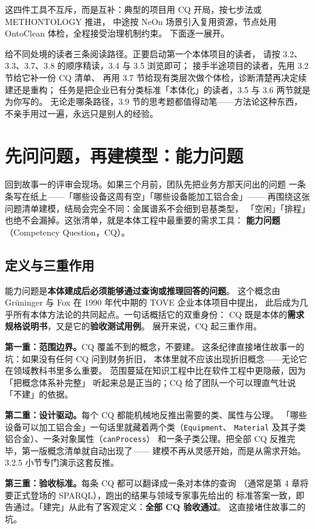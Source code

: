 这四件工具不互斥，而是互补：典型的项目用 CQ 开局，按七步法或 METHONTOLOGY 推进，
中途按 NeOn 场景引入复用资源，节点处用 OntoClean 体检，全程接受治理机制约束。
下面逐一展开。

给不同处境的读者三条阅读路径。正要启动第一个本体项目的读者，
请按 3.2、3.3、3.7、3.8 的顺序精读，3.4 与 3.5 浏览即可；
接手半途项目的读者，先用 3.2 节给它补一份 CQ 清单、
再用 3.7 节给现有类层次做个体检，诊断清楚再决定续建还是重构；
任务是把企业已有分类标准「本体化」的读者，3.5 与 3.6 两节就是为你写的。
无论走哪条路径，3.9 节的思考题都值得动笔——方法论这种东西，
不亲手用过一遍，永远只是别人的经验。

\section{先问问题，再建模型：能力问题}

回到故事一的评审会现场。如果三个月前，团队先把业务方那天问出的问题
一条条写在纸上——「哪些设备这周有空」「哪些设备能加工铝合金」——
再围绕这张问题清单建模，结局会完全不同：金属谱系不会细到皂基类型，
「空闲」「排程」也绝不会漏掉。这张清单，就是本体工程中最重要的需求工具：
\textbf{能力问题}（Competency Question，CQ）。

\subsection{定义与三重作用}

能力问题是\textbf{本体建成后必须能够通过查询或推理回答的问题}。
这个概念由 Gr\"uninger 与 Fox 在 1990 年代中期的 TOVE 企业本体项目中提出，
此后成为几乎所有本体方法论的共同起点。一句话概括它的双重身份：
CQ 既是本体的\textbf{需求规格说明书}，又是它的\textbf{验收测试用例}。
展开来说，CQ 起三重作用。

\textbf{第一重：范围边界。}CQ 覆盖不到的概念，不要建。
这条纪律直接堵住故事一的坑：如果没有任何 CQ 问到财务折旧，
本体里就不应该出现折旧概念——无论它在领域教科书里多么重要。
范围蔓延在知识工程中比在软件工程中更隐蔽，因为「把概念体系补完整」
听起来总是正当的；CQ 给了团队一个可以理直气壮说「不建」的依据。

\textbf{第二重：设计驱动。}每个 CQ 都能机械地反推出需要的类、属性与公理。
「哪些设备可以加工铝合金」一句话里就藏着两个类（\texttt{Equipment}、
\texttt{Material} 及其子类铝合金）、一条对象属性（\texttt{canProcess}）
和一条子类公理。把全部 CQ 反推完毕，第一版概念清单就自动出现了——
建模不再从灵感开始，而是从需求开始。3.2.5 小节专门演示这套反推。

\textbf{第三重：验收标准。}每条 CQ 都可以翻译成一条对本体的查询
（通常是第 4 章将要正式登场的 SPARQL），跑出的结果与领域专家事先给出的
标准答案一致，即告通过。「建完」从此有了客观定义：\textbf{全部 CQ 验收通过}。
这直接堵住故事二的坑。


